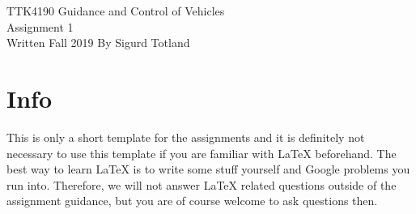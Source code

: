 \documentclass[a4paper]{article}
\begin{document}
\begin{titlepage}
\begin{center}
\Large TTK4190 Guidance and Control of Vehicles \\
\vspace{10pt}
\Large Assignment 1 \\
\vspace{10pt}
\large Written Fall 2019 By Sigurd Totland
\end{center}
\end{titlepage}

\section*{Info}
This is only a short template for the assignments and it is definitely not necessary to use this template if you are familiar with \LaTeX{} beforehand. The best way to learn \LaTeX{} is to write some stuff yourself and Google problems you run into. Therefore, we will not answer \LaTeX{} related questions outside of the assignment guidance, but you are of course welcome to ask questions then.





\end{document}
